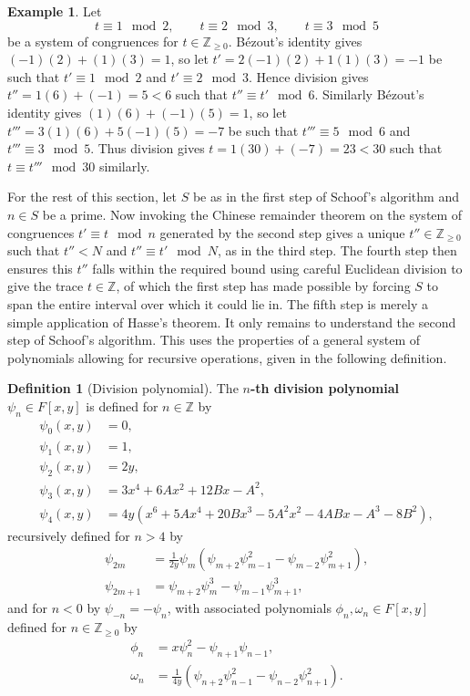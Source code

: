 \documentclass{article}
\newcommand{\Z}{\mathbb{Z}}
\newcommand{\rb}[1]{\left( #1 \right)}
\renewcommand{\sb}[1]{\left[ #1 \right]}
\theoremstyle{definition}\newtheorem*{definition}{Definition}
\theoremstyle{definition}\newtheorem*{example}{Example}
\theoremstyle{definition}\newtheorem*{remark}{Remark}
\begin{document}
\begin{example}
Let
$$ t \equiv 1 \mod 2, \qquad t \equiv 2 \mod 3, \qquad t \equiv 3 \mod 5 $$
be a system of congruences for $ t \in \Z_{\ge 0} $. Bézout's identity gives $ \rb{-1}\rb{2} + \rb{1}\rb{3} = 1 $, so let $ t' = 2\rb{-1}\rb{2} + 1\rb{1}\rb{3} = -1 $ be such that $ t' \equiv 1 \mod 2 $ and $ t' \equiv 2 \mod 3 $. Hence division gives $ t'' = 1\rb{6} + \rb{-1} = 5 < 6 $ such that $ t'' \equiv t' \mod 6 $. Similarly Bézout's identity gives $ \rb{1}\rb{6} + \rb{-1}\rb{5} = 1 $, so let $ t''' = 3\rb{1}\rb{6} + 5\rb{-1}\rb{5} = -7 $ be such that $ t''' \equiv 5 \mod 6 $ and $ t''' \equiv 3 \mod 5 $. Thus division gives $ t = 1\rb{30} + \rb{-7} = 23 < 30 $ such that $ t \equiv t''' \mod 30 $ similarly.
\end{example}

For the rest of this section, let $ S $ be as in the first step of Schoof's algorithm and $ n \in S $ be a prime. Now invoking the Chinese remainder theorem on the system of congruences $ t' \equiv t \mod n $ generated by the second step gives a unique $ t'' \in \Z_{\ge 0} $ such that $ t'' < N $ and $ t'' \equiv t' \mod N $, as in the third step. The fourth step then ensures this $ t'' $ falls within the required bound using careful Euclidean division to give the trace $ t \in \Z $, of which the first step has made possible by forcing $ S $ to span the entire interval over which it could lie in. The fifth step is merely a simple application of Hasse's theorem. It only remains to understand the second step of Schoof's algorithm. This uses the properties of a general system of polynomials allowing for recursive operations, given in the following definition.

\begin{definition}[Division polynomial]
The \textbf{$ n $-th division polynomial} $ \psi_n \in F\sb{x, y} $ is defined for $ n \in \Z $ by
\begin{align*}
\psi_0\rb{x, y} & = 0, \\
\psi_1\rb{x, y} & = 1, \\
\psi_2\rb{x, y} & = 2y, \\
\psi_3\rb{x, y} & = 3x^4 + 6Ax^2 + 12Bx - A^2, \\
\psi_4\rb{x, y} & = 4y\rb{x^6 + 5Ax^4 + 20Bx^3 - 5A^2x^2 - 4ABx - A^3 - 8B^2},
\end{align*}
recursively defined for $ n > 4 $ by
\begin{align*}
\psi_{2m} & = \tfrac{1}{2y}\psi_m\rb{\psi_{m + 2}\psi_{m - 1}^2 - \psi_{m - 2}\psi_{m + 1}^2}, \\
\psi_{2m + 1} & = \psi_{m + 2}\psi_m^3 - \psi_{m - 1}\psi_{m + 1}^3,
\end{align*}
and for $ n < 0 $ by $ \psi_{-n} = -\psi_n $, with associated polynomials $ \phi_n, \omega_n \in F\sb{x, y} $ defined for $ n \in \Z_{\ge 0} $ by
\begin{align*}
\phi_n & = x\psi_n^2 - \psi_{n + 1}\psi_{n - 1}, \\
\omega_n & = \tfrac{1}{4y}\rb{\psi_{n + 2}\psi_{n - 1}^2 - \psi_{n - 2}\psi_{n + 1}^2}.
\end{align*}
\end{definition}
\end{document}
